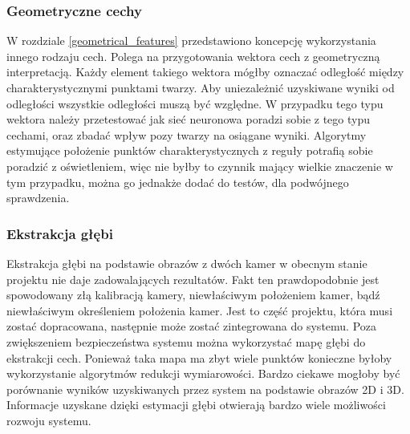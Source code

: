 \documentclass[oneside, eng]{mgr}
\begin{document}
\subsubsection{Geometryczne cechy}
W rozdziale \ref{geometrical_features} przedstawiono koncepcję wykorzystania innego rodzaju cech. Polega na przygotowania wektora cech z geometryczną interpretacją. Każdy element takiego wektora mógłby oznaczać odległość między charakterystycznymi punktami twarzy. Aby uniezależnić uzyskiwane wyniki od odległości wszystkie odległości muszą być względne. W przypadku tego typu wektora należy przetestować jak sieć neuronowa poradzi sobie z tego typu cechami, oraz zbadać wpływ pozy twarzy na osiągane wyniki. Algorytmy estymujące położenie punktów charakterystycznych z reguły potrafią sobie poradzić z oświetleniem, więc nie byłby to czynnik mający wielkie znaczenie w tym przypadku, można go jednakże dodać do testów, dla podwójnego sprawdzenia.

\subsubsection{Ekstrakcja głębi}
Ekstrakcja głębi na podstawie obrazów z dwóch kamer w obecnym stanie projektu nie daje zadowalających rezultatów. Fakt ten prawdopodobnie jest spowodowany złą kalibracją kamery, niewłaściwym położeniem kamer, bądź niewłaściwym określeniem położenia kamer. Jest to część projektu, która musi zostać dopracowana, następnie może zostać zintegrowana do systemu. Poza zwiększeniem bezpieczeństwa systemu można wykorzystać mapę głębi do ekstrakcji cech. Ponieważ taka mapa ma zbyt wiele punktów konieczne byłoby wykorzystanie algorytmów redukcji wymiarowości. Bardzo ciekawe mogłoby być porównanie wyników uzyskiwanych przez system na podstawie obrazów 2D i 3D. Informacje uzyskane dzięki estymacji głębi otwierają bardzo wiele możliwości rozwoju systemu.
\end{document}
